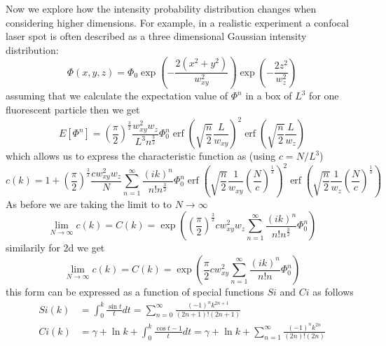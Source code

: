 \documentclass[%
 reprint,
 amsmath,amssymb,
 aps,
]{revtex4-1}
\DeclareMathOperator\erf{erf}
\begin{document}
Now we explore how the intensity probability distribution changes when considering higher dimensions.  For example, in a realistic experiment a confocal laser spot is often described as a three dimensional Gaussian intensity distribution:
\begin{equation}
	\Phi(x,y,z) = \Phi_{0}\exp{\left(-\frac{2(x^{2}+y^{2})}{w_{xy}^2}\right)}\exp{\left(-\frac{2z^{2}}{w_{z}^2}\right)}
\end{equation}
assuming that we calculate the expectation value of $\Phi^n$ in a box of $L^3$ for one fluorescent particle then we get
\begin{equation}
	E[\Phi^{n}] = \left(\frac{\pi}{2}\right)^{\frac{3}{2}}\frac{w_{xy}^{2}w_{z}}{L^{3}n^{\frac{3}{2}}}\Phi_{0}^{n} \erf{\left(\sqrt{\frac{n}{2}}\frac{L}{w_{xy}}\right)}^{2}\erf{\left(\sqrt{\frac{n}{2}}\frac{L}{w_{z}}\right)}
\end{equation}
which allows us to express the characteristic function as (using $c=N/L^{3}$)
\begin{equation}
	c(k) = 1+\left(\frac{\pi}{2}\right)^{\frac{3}{2}}\frac{cw_{xy}^{2}w_{z}}{N}\sum_{n=1}^{\infty}\frac{(ik)^{n}}{n!n^{\frac{3}{2}}}\Phi_{0}^{n} \erf{\left(\sqrt{\frac{n}{2}}\frac{1}{w_{xy}}\left(\frac{N}{c}\right)^{\frac{1}{3}}\right)}^{2}\erf{\left(\sqrt{\frac{n}{2}}\frac{1}{w_{z}}\left(\frac{N}{c}\right)^{\frac{1}{3}}\right)}
\end{equation}
As before we are taking the limit to to $N\rightarrow \infty$
\begin{equation}
	\lim_{N\rightarrow \infty}c(k) = C(k) = \exp\left(\left(\frac{\pi}{2}\right)^{\frac{3}{2}}cw_{xy}^{2}w_{z}\sum_{n=1}^{\infty}\frac{(ik)^{n}}{n!n^{\frac{3}{2}}}\Phi_{0}^{n}\right)
\end{equation}
similarily for 2d we get
\begin{equation}
	\lim_{N\rightarrow \infty}c(k) = C(k) = \exp\left(\frac{\pi}{2}cw_{xy}^{2}\sum_{n=1}^{\infty}\frac{(ik)^{n}}{n!n}\Phi_{0}^{n}\right)
\end{equation}
this form can be expressed as a function of special functions $Si$ and $Ci$ as follows
\begin{equation}
	\begin{aligned}
		Si(k)&=\int_{0}^{k}\frac{\sin t}{t}dt = \sum_{n=0}^{\infty}\frac{(-1)^{n}k^{2n+1}}{(2n+1)!(2n+1)}\\
		Ci(k)&=\gamma+\ln k +\int_{0}^{k}\frac{\cos t - 1}{t}dt=\gamma + \ln k + \sum_{n=1}^{\infty}\frac{(-1)^{n}k^{2n}}{(2n)!(2n)}
	\end{aligned}
\end{equation}
\end{document}
